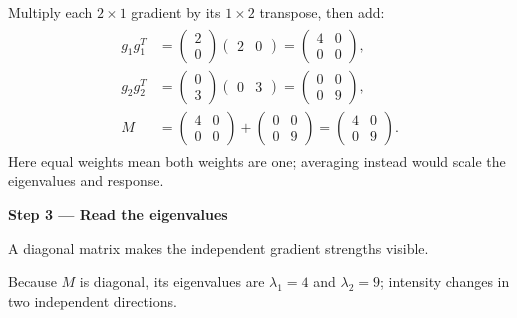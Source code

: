 \documentclass[letterpaper,11pt,english,openany,oneside]{jupyterBook}
\begin{document}
\sphinxAtStartPar
Multiply each {\color{QuizMathBlue} \(2\times1\)} gradient by its {\color{QuizMathBlue} \(1\times2\)} transpose, then add:
{\color{QuizMathBlue} \begin{equation*}
\begin{split}
\begin{aligned}
g_1g_1^T&=\begin{pmatrix}2\\0\end{pmatrix}\begin{pmatrix}2&0\end{pmatrix}
=\begin{pmatrix}4&0\\0&0\end{pmatrix},\\
g_2g_2^T&=\begin{pmatrix}0\\3\end{pmatrix}\begin{pmatrix}0&3\end{pmatrix}
=\begin{pmatrix}0&0\\0&9\end{pmatrix},\\
M&=\begin{pmatrix}4&0\\0&0\end{pmatrix}+\begin{pmatrix}0&0\\0&9\end{pmatrix}
=\begin{pmatrix}4&0\\0&9\end{pmatrix}.
\end{aligned}
\end{split}
\end{equation*}}
\sphinxAtStartPar
Here equal weights mean both weights are one; averaging instead would scale the eigenvalues and response.

\par

\par\medskip{}
{\color{QuizStepRed}\bfseries Step 3 — Read the eigenvalues}\par\smallskip

\sphinxAtStartPar
{} A diagonal matrix makes the independent gradient strengths visible.

\sphinxAtStartPar
Because {\color{QuizMathBlue} \(M\)} is diagonal, its eigenvalues are {\color{QuizMathBlue} \(\lambda_1=4\)} and {\color{QuizMathBlue} \(\lambda_2=9\)}; intensity changes in two independent directions.
\end{document}
